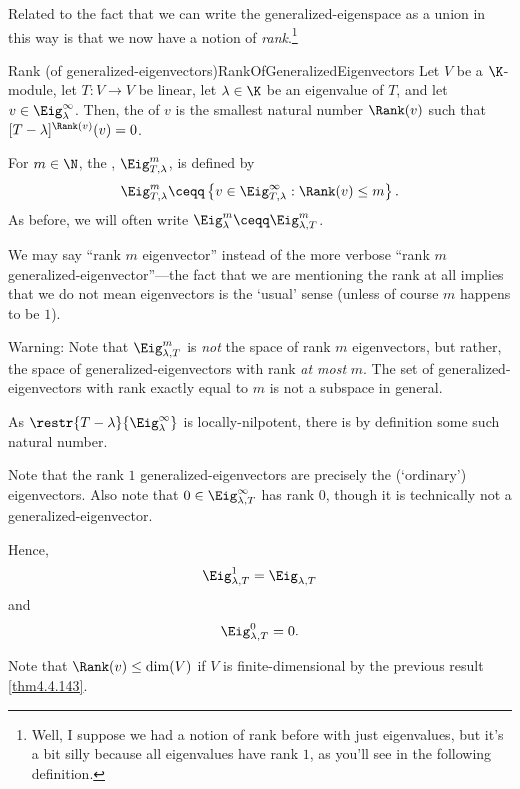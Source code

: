 Related to the fact that we can write the generalized-eigenspace as a union in this way is that we now have a notion of \emph{rank}.\footnote{Well, I suppose we had a notion of rank before with just eigenvalues, but it's a bit silly because all eigenvalues have rank $1$, as you'll see in the following definition.}
\begin{dfn}{Rank (of generalized-eigenvectors)}{RankOfGeneralizedEigenvectors}
	Let $V$ be a $\K$-module, let $T\colon V\rightarrow V$ be linear, let $\lambda \in \K$ be an eigenvalue of $T$, and let $v\in \Eig _{\lambda}^{\infty}$.  Then, the  of $v$ is the smallest natural number $\Rank (v)$ such that $[T-\lambda ]^{\Rank (v)}(v)=0$.
	\begin{rmk}
		For $m\in \N$, the , $\Eig _{T,\lambda}^m$, is defined by
		\begin{equation}
			\Eig _{T,\lambda}^m\ceqq \left\{ v\in \Eig _{T,\lambda}^{\infty}:\Rank (v)\leq m\right\} .
		\end{equation}
		As before, we will often write $\Eig _{\lambda}^m\ceqq \Eig _{\lambda ,T}^m$.
	\end{rmk}
	\begin{rmk}
		We may say ``rank $m$ eigenvector'' instead of the more verbose ``rank $m$ generalized-eigenvector''---the fact that we are mentioning the rank at all implies that we do not mean eigenvectors is the `usual' sense (unless of course $m$ happens to be $1$).
	\end{rmk}
	\begin{rmk}
		Warning:  Note that $\Eig _{\lambda ,T}^m$ is \emph{not} the space of rank $m$ eigenvectors, but rather, the space of generalized-eigenvectors with rank \emph{at most} $m$.  The set of generalized-eigenvectors with rank exactly equal to $m$ is not a subspace in general.
	\end{rmk}
	\begin{rmk}
		As $\restr{T-\lambda}{\Eig _{\lambda}^{\infty}}$ is locally-nilpotent, there is by definition some such natural number.
	\end{rmk}
	\begin{rmk}
		Note that the rank $1$ generalized-eigenvectors are precisely the (`ordinary') eigenvectors.  Also note that $0\in \Eig _{\lambda ,T}^{\infty}$ has rank $0$, though it is technically not a generalized-eigenvector.
	\end{rmk}
	\begin{rmk}
		Hence,
		\begin{equation}
			\Eig _{\lambda ,T}^1=\Eig _{\lambda ,T}
		\end{equation}
		and
		\begin{equation}
			\Eig _{\lambda ,T}^0=0.
		\end{equation}
	\end{rmk}
	\begin{rmk}
		Note that $\Rank (v)\leq \dim (V)$ if $V$ is finite-dimensional by the previous result \cref{thm4.4.143}.
	\end{rmk}
\end{dfn}
